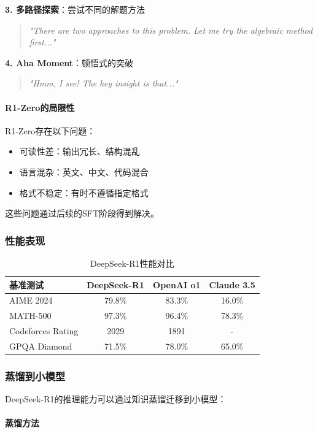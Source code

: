 \documentclass[12pt,a4paper]{article}
\begin{document}
\textbf{3. 多路径探索}：尝试不同的解题方法
\begin{quote}
\textit{"There are two approaches to this problem. Let me try the algebraic method first..."}
\end{quote}

\textbf{4. Aha Moment}：顿悟式的突破
\begin{quote}
\textit{"Hmm, I see! The key insight is that..."}
\end{quote}

\paragraph{R1-Zero的局限性}

R1-Zero存在以下问题：
\begin{itemize}
    \item 可读性差：输出冗长、结构混乱
    \item 语言混杂：英文、中文、代码混合
    \item 格式不稳定：有时不遵循指定格式
\end{itemize}

这些问题通过后续的SFT阶段得到解决。

\subsubsection{性能表现}

\begin{table}[H]
\centering
\caption{DeepSeek-R1性能对比}
\begin{tabular}{lccc}
\toprule
\textbf{基准测试} & \textbf{DeepSeek-R1} & \textbf{OpenAI o1} & \textbf{Claude 3.5} \\
\midrule
AIME 2024 & 79.8\% & 83.3\% & 16.0\% \\
MATH-500 & 97.3\% & 96.4\% & 78.3\% \\
Codeforces Rating & 2029 & 1891 & - \\
GPQA Diamond & 71.5\% & 78.0\% & 65.0\% \\
\bottomrule
\end{tabular}
\end{table}

\subsubsection{蒸馏到小模型}

DeepSeek-R1的推理能力可以通过知识蒸馏迁移到小模型：

\paragraph{蒸馏方法}
\end{document}
